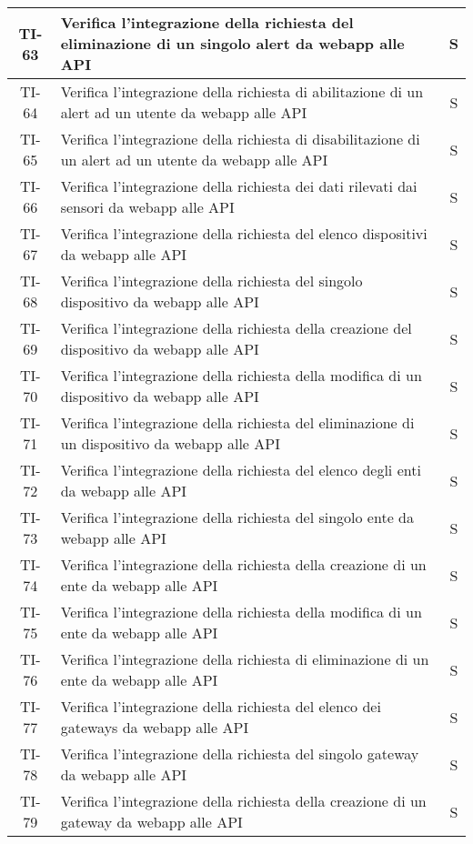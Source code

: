 \begin{center}
\begin{longtable}{|c|p{12cm}|c|}
			\hline
			TI-63 & Verifica l'integrazione della richiesta del eliminazione di un singolo alert da webapp alle API & S \\
			\hline
			TI-64 & Verifica l'integrazione della richiesta di abilitazione di un alert ad un utente da webapp alle API & S \\
			\hline
			TI-65 & Verifica l'integrazione della richiesta di disabilitazione di un alert ad un utente da webapp alle API & S \\
			\hline
			TI-66 & Verifica l'integrazione della richiesta dei dati rilevati dai sensori da webapp alle API & S \\
			\hline
			TI-67 & Verifica l'integrazione della richiesta del elenco dispositivi da webapp alle API & S \\
			\hline
			TI-68 & Verifica l'integrazione della richiesta del singolo dispositivo da webapp alle API & S \\
			\hline
			TI-69 & Verifica l'integrazione della richiesta della creazione del dispositivo da webapp alle API & S \\
			\hline
			TI-70 & Verifica l'integrazione della richiesta della modifica di un dispositivo da webapp alle API & S \\
			\hline
			TI-71 & Verifica l'integrazione della richiesta del eliminazione di un dispositivo da webapp alle API & S \\
			\hline
			TI-72 & Verifica l'integrazione della richiesta del elenco degli enti da webapp alle API & S \\
			\hline
			TI-73 & Verifica l'integrazione della richiesta del singolo ente da webapp alle API & S \\
			\hline
			TI-74 & Verifica l'integrazione della richiesta della creazione di un ente da webapp alle API & S \\
			\hline
			TI-75 & Verifica l'integrazione della richiesta della modifica di un ente da webapp alle API & S \\
			\hline
			TI-76 & Verifica l'integrazione della richiesta di eliminazione di un ente da webapp alle API & S \\
			\hline
			TI-77 & Verifica l'integrazione della richiesta del elenco dei gateways da webapp alle API & S \\
			\hline
			TI-78 & Verifica l'integrazione della richiesta del singolo gateway da webapp alle API & S \\
			\hline
			TI-79 & Verifica l'integrazione della richiesta della creazione di un gateway da webapp alle API & S \\

\end{longtable}
\end{center}
